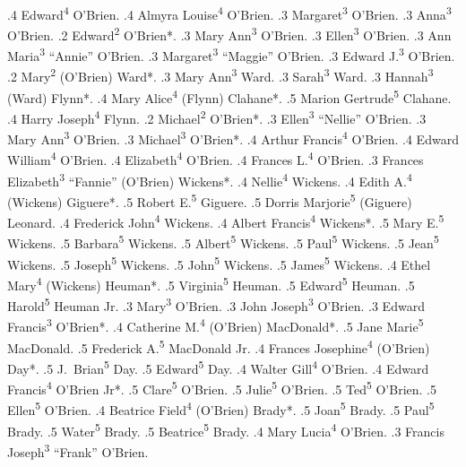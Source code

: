 {			.4 Edward\textsuperscript{4} O'Brien.
			.4 Almyra Louise\textsuperscript{4} O'Brien. 
		.3 Margaret\textsuperscript{3} O'Brien.
		.3 Anna\textsuperscript{3} O'Brien.
	.2 Edward\textsuperscript{2} O'Brien*.
		.3 Mary Ann\textsuperscript{3} O'Brien.
		.3 Ellen\textsuperscript{3} O'Brien.
		.3 Ann Maria\textsuperscript{3} ``Annie'' O'Brien.
		.3 Margaret\textsuperscript{3} ``Maggie'' O'Brien.
		.3 Edward J.\textsuperscript{3} O'Brien.
	.2 Mary\textsuperscript{2} (O'Brien) Ward*.
		.3 Mary Ann\textsuperscript{3} Ward.
		.3 Sarah\textsuperscript{3} Ward.
		.3 Hannah\textsuperscript{3} (Ward) Flynn*.
			.4 Mary Alice\textsuperscript{4} (Flynn) Clahane*.
				.5 Marion Gertrude\textsuperscript{5} Clahane.
			.4 Harry Joseph\textsuperscript{4} Flynn.
	.2 Michael\textsuperscript{2} O'Brien*.
		.3 Ellen\textsuperscript{3} ``Nellie'' O'Brien.
		.3 Mary Ann\textsuperscript{3} O'Brien.
		.3 Michael\textsuperscript{3} O'Brien*.
			.4 Arthur Francis\textsuperscript{4} O'Brien.
			.4 Edward William\textsuperscript{4} O'Brien.
			.4 Elizabeth\textsuperscript{4} O'Brien.
			.4 Frances L.\textsuperscript{4} O'Brien.
		.3 Frances Elizabeth\textsuperscript{3} ``Fannie'' (O'Brien) Wickens*.
			.4 Nellie\textsuperscript{4} Wickens.
			.4 Edith A.\textsuperscript{4} (Wickens) Giguere*.
				.5 Robert E.\textsuperscript{5} Giguere.
				.5 Dorris Marjorie\textsuperscript{5} (Giguere) Leonard.
			.4 Frederick John\textsuperscript{4} Wickens.
			.4 Albert Francis\textsuperscript{4} Wickens*.
				.5 Mary E.\textsuperscript{5} Wickens.
				.5 Barbara\textsuperscript{5} Wickens.
				.5 Albert\textsuperscript{5} Wickens.
				.5 Paul\textsuperscript{5} Wickens.
				.5 Jean\textsuperscript{5} Wickens.
				.5 Joseph\textsuperscript{5} Wickens.
				.5 John\textsuperscript{5} Wickens.
				.5 James\textsuperscript{5} Wickens.
			.4 Ethel Mary\textsuperscript{4} (Wickens) Heuman*.
				.5 Virginia\textsuperscript{5} Heuman.
				.5 Edward\textsuperscript{5} Heuman.
				.5 Harold\textsuperscript{5} Heuman Jr.
		.3 Mary\textsuperscript{3} O'Brien.
		.3 John Joseph\textsuperscript{3} O'Brien.
		.3 Edward Francis\textsuperscript{3} O'Brien*.
			.4 Catherine M.\textsuperscript{4} (O'Brien) MacDonald*.
				.5 Jane Marie\textsuperscript{5} MacDonald.
				.5 Frederick A.\textsuperscript{5} MacDonald Jr.
			.4 Frances Josephine\textsuperscript{4} (O'Brien) Day*.
				.5 J.\ Brian\textsuperscript{5} Day.
				.5 Edward\textsuperscript{5} Day.
			.4 Walter Gill\textsuperscript{4} O'Brien.
			.4 Edward Francis\textsuperscript{4} O'Brien Jr*.
				.5 Clare\textsuperscript{5} O'Brien.
				.5 Julie\textsuperscript{5} O'Brien.
				.5 Ted\textsuperscript{5} O'Brien.
				.5 Ellen\textsuperscript{5} O'Brien.
			.4 Beatrice Field\textsuperscript{4} (O'Brien) Brady*.
				.5 Joan\textsuperscript{5} Brady.
				.5 Paul\textsuperscript{5} Brady.
				.5 Water\textsuperscript{5} Brady.
				.5 Beatrice\textsuperscript{5} Brady.
			.4 Mary Lucia\textsuperscript{4} O'Brien.
		.3 Francis Joseph\textsuperscript{3} ``Frank'' O'Brien.
}

